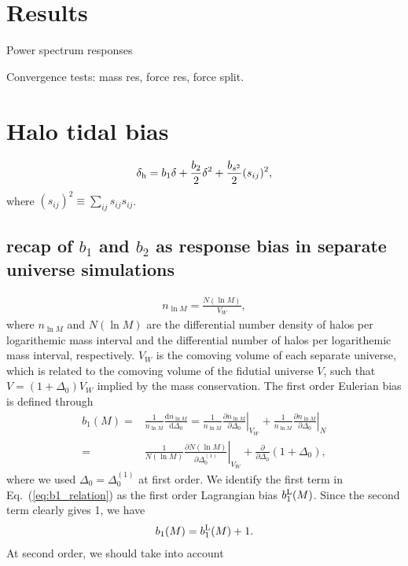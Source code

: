 \documentclass[a4paper,11pt]{article}
\renewcommand{\d}{\mathrm{d}}
\begin{document}
\section{Results}
\label{sec:results}


Power spectrum responses


Convergence tests: mass res, force res, force split.

\section{Halo tidal bias}
\label{sec:bias}
\begin{align}
\delta_{\rm h} = b_1 \delta + \frac{b_2}{2}\delta^2 + \frac{b_{s^2}}{2}(s_{ij})^2,
\end{align}
where $(s_{ij})^2 \equiv \sum_{ij}s_{ij}s_{ij}$.
\subsection{recap of $b_1$ and $b_2$ as response bias in separate universe simulations}
\begin{align}
n_{\ln{M}} = \frac{N(\ln{M})}{V_W},
\end{align}
where $n_{\ln{M}}$ and $N(\ln{M})$ are the differential number density of halos per logarithemic mass interval and 
the differential number of halos per logarithemic mass interval, respectively.
$V_W$ is the comoving volume of each separate universe, which is related to the comoving volume of the  fidutial universe $V$, such that $V = (1+\Delta_0) V_W$ implied by the mass conservation.
The first order Eulerian bias is defined through
\begin{align}
b_{1}(M) =& \frac{1}{n_{\ln{M}}}
\frac{\d n_{\ln{M}}}{\d \Delta_0}
=\frac{1}{n_{\ln{M}}} \left.\frac{\partial n_{\ln{M}}}{\partial\Delta_0}\right|_{V_W}
+ \frac{1}{n_{\ln{M}}}\left.\frac{\partial n_{\ln{M}}}{\partial \Delta_0}\right|_{N}
\\
=& \frac{1}{N(\ln{M})}
\left.\frac{\partial N(\ln{M})}{\partial \Delta^{(1)}_0}\right|_{V_W}
+\frac{\partial}{\partial \Delta_0}\left(1+\Delta_0\right),
\label{eq:b1_relation}
\end{align}
where we used $\Delta_0 = \Delta_0^{(1)}$ at first order.
We identify the first term in Eq.~(\ref{eq:b1_relation}) as 
the first order Lagrangian bias $b_1^{\rm L}(M)$. 
Since the second term clearly gives 1, we have
\begin{align}
b_1(M) = b_1^{\rm L}(M) + 1.
\end{align}
At second order, we should take into account 
\end{document}

